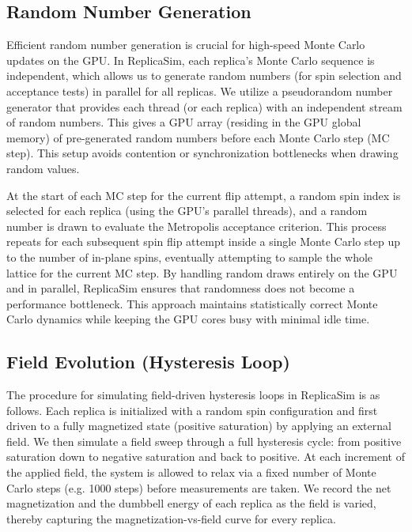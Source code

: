 \documentclass[journal=nalefd,manuscript=letter]{achemso}
\begin{document}
\subsection{Random Number Generation}
Efficient random number generation is crucial for high-speed Monte Carlo updates on the GPU. In ReplicaSim, each replica’s Monte Carlo sequence is independent, which allows us to generate random numbers (for spin selection and acceptance tests) in parallel for all replicas. We utilize a pseudorandom number generator that provides each thread (or each replica) with an independent stream of random numbers. This gives a GPU array (residing in the GPU global memory) of pre-generated random numbers before each Monte Carlo step (MC step).  This setup avoids contention or synchronization bottlenecks when drawing random values. 

At the start of each MC step for the current flip attempt, a random spin index is selected for each replica (using the GPU’s parallel threads), and a random number is drawn to evaluate the Metropolis acceptance criterion. This process repeats for each subsequent spin flip attempt inside a single Monte Carlo step up to the number of in-plane spins, eventually attempting to sample the whole lattice for the current MC step. By handling random draws entirely on the GPU and in parallel, ReplicaSim ensures that randomness does not become a performance bottleneck. This approach maintains statistically correct Monte Carlo dynamics while keeping the GPU cores busy with minimal idle time.

\subsection{Field Evolution (Hysteresis Loop)}
The procedure for simulating field-driven hysteresis loops in ReplicaSim is as follows. Each replica is initialized with a random spin configuration and first driven to a fully magnetized state (positive saturation) by applying an external field. We then simulate a field sweep through a full hysteresis cycle: from positive saturation down to negative saturation and back to positive. At each increment of the applied field, the system is allowed to relax via a fixed number of Monte Carlo steps (e.g. 1000 steps) before measurements are taken. We record the net magnetization and the dumbbell energy of each replica as the field is varied, thereby capturing the magnetization-vs-field curve for every replica.
\end{document}
